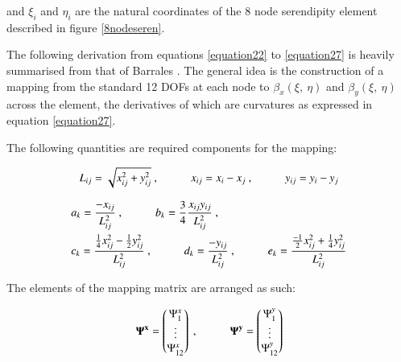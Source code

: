 and $\xi_i$ and $\eta_i$ are the natural coordinates of the 8 node serendipity element described in figure \ref{8nodeseren}.

The following derivation from equations \eqref{equation22} to \eqref{equation27} is heavily summarised from that of Barrales \cite{Bar12}. The general idea is the construction of a mapping from the standard 12 DOFs at each node to $\beta_x (\xi,\ \eta)$ and $\beta_y (\xi,\ \eta)$ across the element, the derivatives of which are curvatures as expressed in equation \eqref{equation27}.

The following quantities are required components for the mapping:

\begin{equation} 
L_{ij} = \sqrt{x_{ij}^2 + y_{ij}^2}\ ,
\hspace{10mm}
x_{ij} = x_i - x_j\ ,
\hspace{10mm}
y_{ij} = y_i - y_j
\label{equation22}
\end{equation}

\begin{gather} 
	\begin{aligned}
		&a_k = \frac{-x_{ij}}{L_{ij}^2}\ ,
		\hspace{10mm}
		b_k = \frac{3}{4} \frac{x_{ij} y_{ij}}{L_{ij}^2}\ , \\
		&c_k = \frac{\frac{1}{4} x_{ij}^2 - \frac{1}{2} y_{ij}^2}{L_{ij}^2}\ ,
		\hspace{10mm}
		d_k = \frac{-y_{ij}}{L_{ij}^2}\ ,
		\hspace{10mm}
		e_k = \frac{\frac{-1}{2} x_{ij}^2 + \frac{1}{4} y_{ij}^2}{L_{ij}^2}
		\label{equation23}
	\end{aligned}
\end{gather}

The elements of the mapping matrix are arranged as such:

\begin{equation} 
\mathbf{\Psi^x} = 
\begin{pmatrix}
\Psi_1^x \\
\vdots \\
\Psi_{12}^x
\end{pmatrix}\ ,
\hspace{10mm}
\mathbf{\Psi^y} = 
\begin{pmatrix}
\Psi_1^y \\
\vdots \\
\Psi_{12}^y
\end{pmatrix}
\label{equation24}
\end{equation}

